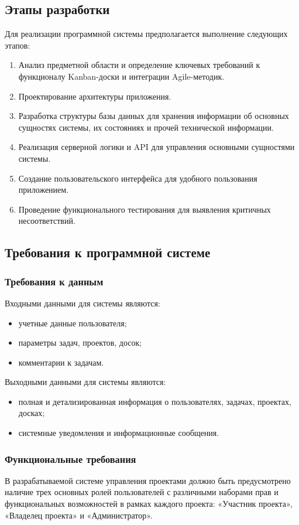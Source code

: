 \subsection{Этапы разработки}

Для реализации программной системы предполагается выполнение следующих этапов:
\begin{enumerate}
	\item Анализ предметной области и определение ключевых требований к функционалу Kanban-доски и интеграции Agile-методик.
	\item Проектирование архитектуры приложения.
	\item Разработка структуры базы данных для хранения информации об основных сущностях системы, их состояниях и прочей технической информации.
	\item Реализация серверной логики и API для управления основными сущностями системы.
	\item Создание пользовательского интерфейса для удобного пользования приложением.
	\item Проведение функционального тестирования для выявления критичных несоответствий.
\end{enumerate}

\subsection{Требования к программной системе}

\subsubsection{Требования к данным}
Входными данными для системы являются:
\begin{itemize}
	\item учетные данные пользователя;
	\item параметры задач, проектов, досок;
	\item комментарии к задачам.
\end{itemize}
Выходными данными для системы являются:
\begin{itemize}
	\item полная и детализированная информация о пользователях, задачах, проектах, досках;
	\item системные уведомления и информационные сообщения.
\end{itemize}

\subsubsection{Функциональные требования}
В разрабатываемой системе управления проектами должно быть предусмотрено наличие трех основных ролей пользователей с различными наборами прав и функциональных возможностей в рамках каждого проекта: «Участник проекта», «Владелец проекта» и «Администратор».

